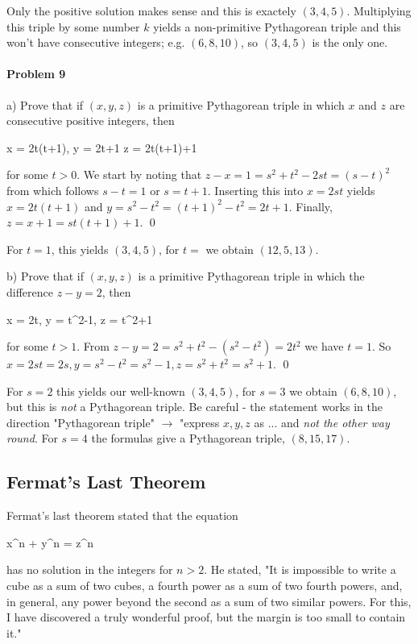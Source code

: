 Only the positive solution makes sense and this is exactely $(3,4,5)$. Multiplying this triple by some number $k$ yields a non-primitive Pythagorean triple and this won't have consecutive integers; e.g. $(6, 8, 10)$, so $(3,4,5)$ is the only one.

\paragraph{Problem 9} a) Prove that if $(x , y, z)$ is a primitive Pythagorean triple in which $x$ and $z$ are consecutive positive integers, then

\bee
x = 2t(t+1), \quad y = 2t+1 \quad z = 2t(t+1)+1
\eee

for some $t > 0$. We start by noting that $z - x = 1 = s^2+t^2 - 2st = (s-t)^2$ from which follows $s - t = 1$ or $s = t+1$. Inserting this into $x = 2st$ yields $x = 2t(t+1)$ and $y = s^2-t^2 = (t+1)^2 - t^2 = 2t+1$. Finally, $z = x+1 = st(t+1)+1$. \qed

For $t=1$, this yields $(3,4,5)$, for $t=$ we obtain $(12, 5, 13)$.

b) Prove that if $(x , y, z)$ is a primitive Pythagorean triple in which the difference $z-y = 2$, then

\bee
x = 2t, \quad y = t^2-1, \quad z = t^2+1
\eee

for some $t > 1$. From $z - y = 2 = s^2+t^2 - (s^2 - t^2) = 2t^2$ we have $t = 1$. So $x = 2st = 2s, y = s^2-t^2 = s^2-1, z = s^2 + t^2 = s^2 + 1$. \qed

For $s=2$ this yields our well-known $(3,4,5)$, for $s=3$ we obtain $(6,8,10)$, but this is \emph{not} a Pythagorean triple. Be careful - the statement works in the direction "Pythagorean triple" $\rightarrow$ "express $x,y,z$ as ... and \emph{not the other way round}. For $s=4$ the formulas give a Pythagorean triple, $(8, 15, 17)$.


\subsection{Fermat's Last Theorem}

Fermat's last theorem stated that the equation

\bee
x^n + y^n = z^n
\eee

has no solution in the integers for $n > 2$. He stated, "It is impossible to write a cube as a sum of two cubes, a fourth power as a sum of two fourth powers, and, in general, any power beyond the second as a sum of two similar powers. For this, I have discovered a truly wonderful proof, but the margin is too small to contain it."

